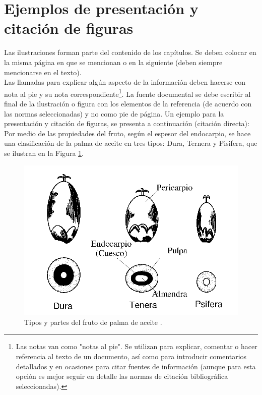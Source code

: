 \section{Ejemplos de presentación y citación de figuras}
Las ilustraciones forman parte del contenido de los capítulos. Se deben colocar en la misma página en que se mencionan o en la siguiente (deben siempre mencionarse en el texto).\\

Las llamadas para explicar algún aspecto de la información deben hacerse con nota al pie y su nota correspondiente\footnote{Las notas van como "notas al pie". Se utilizan para explicar, comentar o hacer referencia al texto de un documento, así como para introducir comentarios detallados y en ocasiones para citar fuentes de información (aunque para esta opción es mejor seguir en detalle las normas de citación bibliográfica seleccionadas).}. La fuente documental se debe escribir al final de la ilustración o figura con los elementos de la referencia (de acuerdo con las normas seleccionadas) y no como pie de página. Un ejemplo para la presentación y citación de figuras, se presenta a continuación (citación directa):\\

Por medio de las propiedades del fruto, según el espesor del endocarpio, se hace una clasificación de la palma de aceite en tres tipos: Dura, Ternera y Pisifera, que se ilustran en la Figura
\ref{fig:Fruto}.\\
\begin{figure}
\centering%
\includegraphics{Kap3/FrutoSp}%
\caption{Tipos y partes del fruto de palma de aceite \cite{AG03p,AG04p}.} \label{fig:Fruto}
\end{figure}

